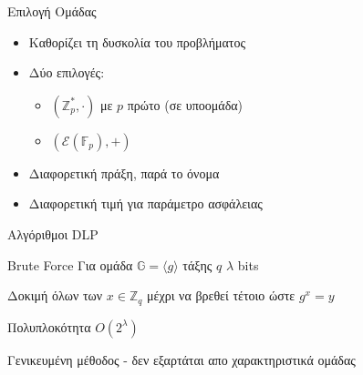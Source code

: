 \documentclass[handout]{beamer}
\begin{document}
\begin{frame}{Επιλογή Ομάδας}
\begin{itemize}
    \item Καθορίζει τη δυσκολία του προβλήματος 
    \item Δύο επιλογές:
    \begin{itemize}
        \item $(\mathbb{Z}_p^*, \cdot)$ με $p$ πρώτο (σε υποομάδα)
        \item $(\mathcal{E}(\mathbb{F}_p),+)$
    \end{itemize}
    \item Διαφορετική πράξη, παρά το όνομα
    \item Διαφορετική τιμή για παράμετρο ασφάλειας    
\end{itemize}
\end{frame}



\begin{frame}{Αλγόριθμοι DLP}
\begin{block}{Brute Force}
Για ομάδα $\mathbb{G}=\langle g \rangle$ τάξης $q$ $\lambda$ bits
\medskip

Δοκιμή όλων των $x \in \mathbb{Z}_q$ μέχρι να βρεθεί τέτοιο ώστε $g^x = y$
\medskip

Πολυπλοκότητα $O(2^\lambda)$

Γενικευμένη μέθοδος - δεν εξαρτάται απο χαρακτηριστικά ομάδας
\end{block}
\end{frame}

%
%
%
%
\end{document}
